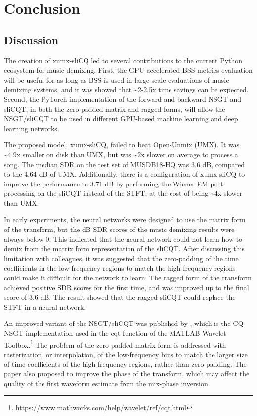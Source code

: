 \documentclass[report.tex]{subfiles}
\begin{document}
\section{Conclusion}
\label{sec:conclusion}

\subsection{Discussion}

The creation of xumx-sliCQ led to several contributions to the current Python ecosystem for music demixing. First, the GPU-accelerated BSS metrics evaluation will be useful for as long as BSS is used in large-scale evaluations of music demixing systems, and it was showed that \textasciitilde2-2.5x time savings can be expected. Second, the PyTorch implementation of the forward and backward NSGT and sliCQT, in both the zero-padded matrix and ragged forms, will allow the NSGT/sliCQT to be used in different GPU-based machine learning and deep learning networks.

The proposed model, xumx-sliCQ, failed to beat Open-Unmix (UMX). It was \textasciitilde4.9x smaller on disk than UMX, but was \textasciitilde2x slower on average to process a song. The median SDR on the test set of MUSDB18-HQ was 3.6 dB, compared to the 4.64 dB of UMX. Additionally, there is a configuration of xumx-sliCQ to improve the performance to 3.71 dB by performing the Wiener-EM post-processing on the sliCQT instead of the STFT, at the cost of being \textasciitilde4x slower than UMX.

In early experiments, the neural networks were designed to use the matrix form of the transform, but the dB SDR scores of the music demixing results were always below 0. This indicated that the neural network could not learn how to demix from the matrix form representation of the sliCQT. After discussing this limitation with colleagues, it was suggested that the zero-padding of the time coefficients in the low-frequency regions to match the high-frequency regions could make it difficult for the network to learn. The ragged form of the transform achieved positive SDR scores for the first time, and was improved up to the final score of 3.6 dB. The result showed that the ragged sliCQT could replace the STFT in a neural network.

An improved variant of the NSGT/sliCQT was published by \textcite{variableq1}, which is the CQ-NSGT implementation used in the cqt function of the MATLAB Wavelet Toolbox.\footnote{\url{https://www.mathworks.com/help/wavelet/ref/cqt.html}} The problem of the zero-padded matrix form is addressed with rasterization, or interpolation, of the low-frequency bins to match the larger size of time coefficients of the high-frequency regions, rather than zero-padding. The paper also proposed to improve the phase of the transform, which may affect the quality of the first waveform estimate from the mix-phase inversion.
\end{document}
